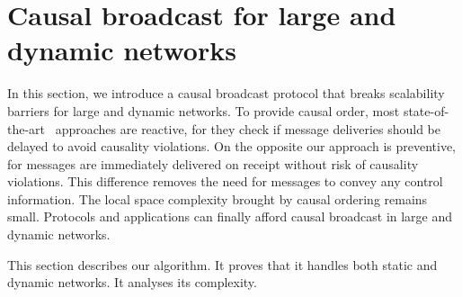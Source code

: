 
\section{Causal broadcast for large and dynamic networks}
\label{sec:proposal}

In this section, we introduce a causal broadcast protocol that breaks
scalability barriers for large and dynamic networks. 
To provide causal order, most
state-of-the-art~\cite{almeida2008interval,birman1987reliable,fidge1988timestamps,hadzilacos1993fault,mattern1989virtual,mostefaoui2017probabilistic,singhal1992efficient}
approaches are reactive, for they check if message deliveries should be delayed
to avoid causality violations. On the opposite our approach is preventive, for
messages are immediately delivered on receipt without risk of causality
violations. This difference removes the need for messages to convey any control
information. The local space complexity brought by causal ordering remains
small.  Protocols and applications can finally afford causal broadcast in large
and dynamic networks.

This section describes our algorithm. It proves that it handles both static and
dynamic networks. It analyses its complexity.


%     



